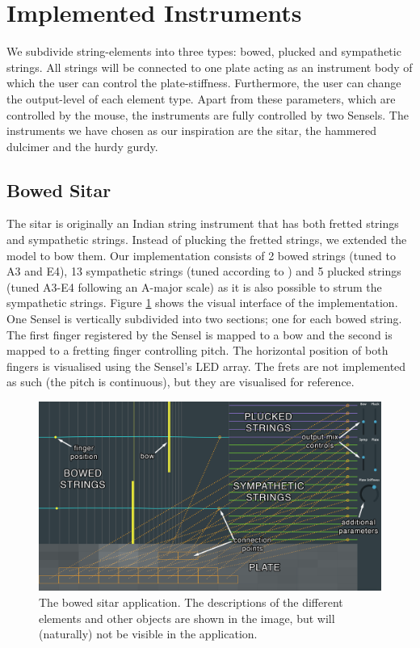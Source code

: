     \section{Implemented Instruments}
    We subdivide string-elements into three types: bowed, plucked and sympathetic strings. All strings will be connected to one plate acting as an instrument body of which the user can control the plate-stiffness. Furthermore, the user can change the output-level of each element type. Apart from these parameters, which are controlled by the mouse, the instruments are fully controlled by two Sensels. The instruments we have chosen as our inspiration are the sitar, the hammered dulcimer and the hurdy gurdy.
    
    \subsection{Bowed Sitar}
    The sitar is originally an Indian string instrument that has both fretted strings and sympathetic strings. Instead of plucking the fretted strings, we extended the model to bow them. Our implementation consists of 2 bowed strings (tuned to A3 and E4), 13 sympathetic strings (tuned according to \cite{sitarTuning}) and 5 plucked strings (tuned A3-E4 following an A-major scale) as it is also possible to strum the sympathetic strings. Figure \ref{fig:bowedSitar} shows the visual interface of the implementation. One Sensel is vertically subdivided into two sections; one for each bowed string. The first finger registered by the Sensel is mapped to a bow and the second is mapped to a fretting finger controlling pitch. The horizontal position of both fingers is visualised using the Sensel's LED array. The frets are not implemented as such (the pitch is continuous), but they are visualised for reference. 
    
    
    \begin{figure}[h]
    \centering
    \includegraphics[width = \paperFigWidth\textwidth]{figures/BowedSitar.png}
    \caption{The bowed sitar application. The descriptions of the different elements and other objects are shown in the image, but will (naturally) not be visible in the application. \label{fig:bowedSitar}}
    \end{figure}
    
